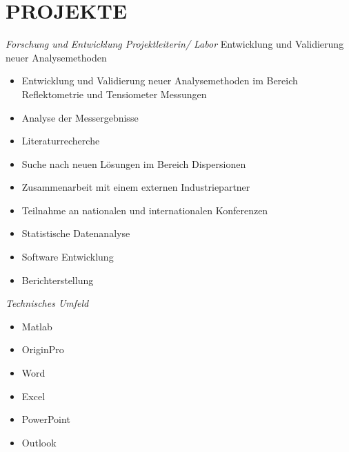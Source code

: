 \documentclass[11pt,a4paper,sans]{moderncv} %
\begin{document}
\section{PROJEKTE}

{
\emph{Forschung und Entwicklung \newline Projektleiterin/ Labor} 
\newline \newline Entwicklung und Validierung neuer Analysemethoden
\newline
\begin{itemize}
	\item Entwicklung und Validierung neuer Analysemethoden im Bereich Reflektometrie und Tensiometer Messungen 
	\item Analyse der Messergebnisse
	\item Literaturrecherche
	\item Suche nach neuen Lösungen im Bereich Dispersionen
	\item Zusammenarbeit mit einem externen Industriepartner
	\item Teilnahme an nationalen und internationalen Konferenzen
	\item Statistische Datenanalyse
	\item Software Entwicklung
	\item Berichterstellung\newline    
\end{itemize} 
\emph{Technisches Umfeld \newline}
\begin{itemize}
	\item Matlab
	\item OriginPro
	\item Word
	\item Excel
	\item PowerPoint
	\item Outlook
\end{itemize}
}  
\end{document}
